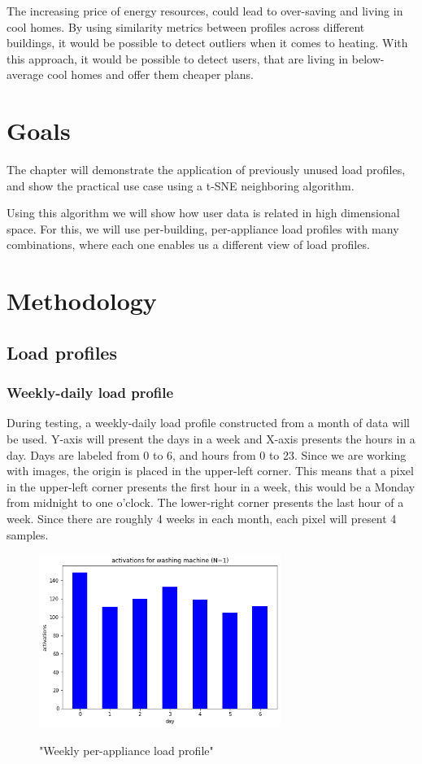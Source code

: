 The increasing price of energy resources, could lead to over-saving and living in cool homes.
By using similarity metrics between profiles across different buildings, it would be possible to detect outliers when it comes to heating. 
With this approach, it would be possible to detect users, that are living in below-average cool homes and offer them cheaper plans. 


\section{Goals}

The chapter will demonstrate the application of previously unused load profiles,
and show the practical use case using a t-SNE neighboring algorithm.

Using this algorithm we will show how user data is related in high dimensional space.
For this, we will use per-building, per-appliance load profiles with many combinations, where
each one enables us a different view of load profiles. 

\section{Methodology}

\subsection{Load profiles}

\subsubsection{Weekly-daily load profile}

During testing, a weekly-daily load profile constructed from a month of data will be used.
Y-axis will present the days in a week and X-axis presents the hours in a day.
Days are labeled from 0 to 6, and hours from 0 to 23.
Since we are working with images, the origin is placed in the upper-left corner. 
This means that a pixel in the upper-left corner presents the first hour in a week,
this would be a Monday from midnight to one o'clock. 
The lower-right corner presents the last hour of a week.
Since there are roughly 4 weeks in each month, each pixel will present 4 samples. 

\begin{figure}[H]
	\centering
	\caption{"Weekly per-appliance load profile"}
	\includegraphics[width=0.7\textwidth]{../Figures/LPS/WM_weekly.png}
	\label{fig:WM_weekly_2}
\end{figure}

